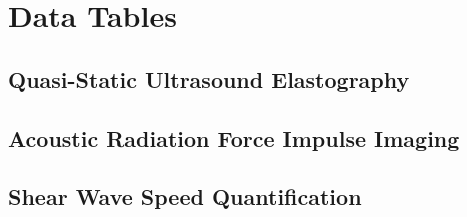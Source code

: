 \chapter{Data Tables}
	\lipsum[1]
	\section{Quasi-Static Ultrasound Elastography}
		\lipsum[1]
	\section{Acoustic Radiation Force Impulse Imaging}
		\lipsum[1]
	\section{Shear Wave Speed Quantification}
		\lipsum[1]